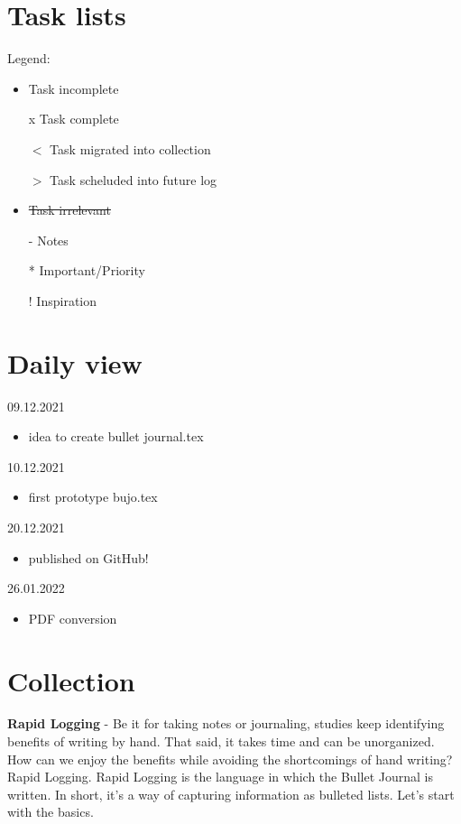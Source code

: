 \documentclass[a4paper]{article}
\begin{document}
\section{Task lists}
Legend:
\begin{itemize}
	\item Task incomplete
	\item[x] Task complete 
	\item[$<$] Task migrated into collection
	\item[$>$] Task scheluded into future log
	\item \sout{Task irrelevant} %
	\item[-] Notes
	\item[*] Important/Priority
	\item[!] Inspiration
\end{itemize}
\newpage
\section{Daily view}
09.12.2021
\begin{itemize}
	\item idea to create bullet journal.tex
\end{itemize}
10.12.2021
\begin{itemize}
	\item first prototype bujo.tex
\end{itemize}
20.12.2021
\begin{itemize}
	\item published on GitHub!
\end{itemize}
26.01.2022
\begin{itemize}
	\item PDF conversion
\end{itemize}
\newpage
\section{Collection}
\textbf{Rapid Logging} - Be it for taking notes or journaling, studies keep identifying benefits of writing by hand. That said, it takes time and can be unorganized. How can we enjoy the benefits while avoiding the shortcomings of hand writing? Rapid Logging. Rapid Logging is the language in which the Bullet Journal is written. In short, it's a way of capturing information as bulleted lists. Let's start with the basics.
\end{document}
